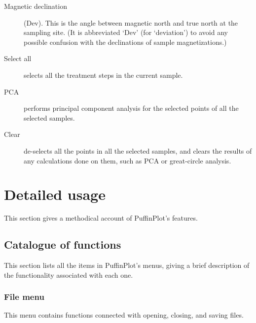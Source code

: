 \documentclass[a4paper,british]{article}
\newcommand{\ppcmd}[1]{\textsf{#1}} %
\newcommand{\caps}[1]{\MakeTextUppercase{#1}} %
\begin{document}
\begin{description}
\item[Magnetic declination] (\ppcmd{Dev}). This is the angle between magnetic
  north and true north at the sampling site. (It is abbreviated `Dev' (for
  `deviation') to avoid any possible confusion with the declinations of
  sample magnetizations.)

\item[Select all] selects all the treatment steps in the current sample.

\item[\caps{Pca}] performs principal component analysis for the
  selected points of all the selected samples.

\item[Clear] de-selects all the points in all the selected
  samples, and clears the results of any calculations done on them, such as
  \caps{pca} or great-circle analysis.

\end{description}

\section{Detailed usage}

This section gives a methodical account of PuffinPlot's features.

\subsection{Catalogue of functions}

This section lists all the items in PuffinPlot's menus, giving a brief
description of the functionality associated with each one.

\subsubsection{\label{sec:menu-file}File menu}

This menu contains functions connected with opening, closing, and
saving files.
\end{document}
